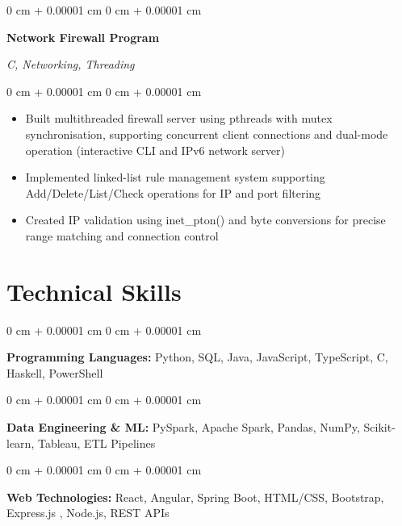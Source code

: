 \documentclass[10pt, a4paper]{article}
\newenvironment{highlights}{
    \begin{itemize}[
        topsep=0.10 cm,
        parsep=0.10 cm,
        partopsep=0pt,
        itemsep=0pt,
        leftmargin=20pt
    ]
}{
    \end{itemize}
} %
\newenvironment{onecolentry}{
    \begin{adjustwidth}{
        0 cm + 0.00001 cm
    }{
        0 cm + 0.00001 cm
    }
}{
    \end{adjustwidth}
} %
\newenvironment{twocolentry}[2][]{
    \onecolentry
    \def\secondColumn{#2}
    \setcolumnwidth{\fill, 4.5 cm}
    \begin{paracol}{2}
}{
    \switchcolumn \raggedleft \secondColumn
    \end{paracol}
    \endonecolentry
} %
\begin{document}
    \vspace{0.2 cm}

    \begin{twocolentry}{
        \textit{C, Networking, Threading}
    }
        \textbf{Network Firewall Program}
    \end{twocolentry}

    \vspace{0.10 cm}
    \begin{onecolentry}
        \begin{highlights}
            \item Built multithreaded firewall server using pthreads with mutex synchronisation, supporting concurrent client connections and dual-mode operation (interactive CLI and IPv6 network server)
            \item Implemented linked-list rule management system supporting Add/Delete/List/Check operations for IP and port filtering
            \item Created IP validation using inet\_pton() and byte conversions for precise range matching and connection control
        \end{highlights}
    \end{onecolentry}

    \section{Technical Skills}

    \begin{onecolentry}
        \textbf{Programming Languages:} Python, SQL, Java, JavaScript, TypeScript, C, Haskell, PowerShell
    \end{onecolentry}

    \vspace{0.2 cm}

    \begin{onecolentry}
        \textbf{Data Engineering \& ML:} PySpark, Apache Spark, Pandas, NumPy, Scikit-learn, Tableau, ETL Pipelines
    \end{onecolentry}

    \vspace{0.2 cm}

    \begin{onecolentry}
        \textbf{Web Technologies:} React, Angular, Spring Boot, HTML/CSS, Bootstrap, Express.js , Node.js, REST APIs
    \end{onecolentry}

    \vspace{0.2 cm}
\end{document}
